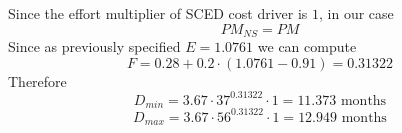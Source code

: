 Since the effort multiplier of SCED cost driver is $1$, in our case $$PM_{NS} = PM$$
Since as previously specified $E = 1.0761$ we can compute $$F = 0.28+0.2 \cdot (1.0761-0.91) = 0.31322$$
Therefore $$D_{min} = 3.67 \cdot 37^{0.31322} \cdot 1 = 11.373 \text{ months}$$
$$D_{max} = 3.67 \cdot 56^{0.31322} \cdot 1 = 12.949 \text{ months}$$
